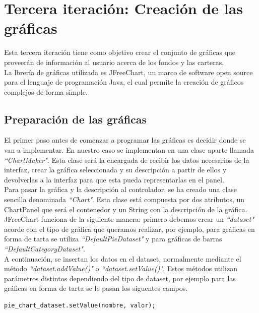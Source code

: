 \documentclass[12pt, a4paper]{article}
\begin{document}
\section{Tercera iteración: Creación de las gráficas}

Esta tercera iteración tiene como objetivo crear el conjunto de gráficas que proveerán de información al usuario acerca de los fondos y las carteras.\\

La lbrería de gráficas utilizada es JFreeChart, un marco de software open source para el lenguaje de programación Java, el cual permite la creación de gráficos complejos de forma simple.

\subsection{Preparación de las gráficas}

El primer paso antes de comenzar a programar las gráficas es decidir donde se van a implementar. En nuestro caso se implementan en una clase aparte llamada \textit{``ChartMaker"}. Esta clase será la encargada de recibir los datos necesarios de la interfaz, crear la gráfica seleccionada y su descripción a partir de ellos y devolverlas a la interfaz para que esta pueda representarlas en el panel.\\

Para pasar la gráfica y la descripción al controlador, se ha creado una clase sencilla denominada \textit{``Chart"}. Esta clase está compuesta por dos atributos, un ChartPanel que será el contenedor y un String con la descripción de la gráfica.\\

JFreeChart funciona de la siguiente manera: primero debemos crear un \textit{``dataset"} acorde con el tipo de gráfica que queramos realizar, por ejemplo, para gráficas en forma de tarta se utiliza \textit{``DefaultPieDataset"} y para gráficas de barras \textit{``DefaultCategoryDataset"}.\\

A continuación, se insertan los datos en el dataset, normalmente mediante el método \textit{``dataset.addValue()"} o \textit{``dataset.setValue()"}. Estos métodos utilizan parámetros distintos dependiendo del tipo de dataset, por ejemplo para las gráficas en forma de tarta se le pasan los siguentes campos.

\begin{verbatim}
pie_chart_dataset.setValue(nombre, valor);
\end{verbatim}
\end{document}
